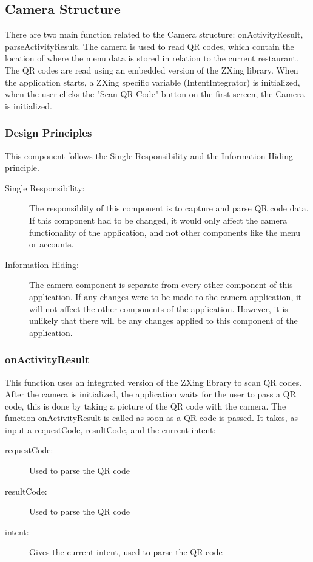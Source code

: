 \documentclass[12pt, titlepage]{article}
\begin{document}
\subsection{Camera Structure}
There are two main function related to the Camera structure: onActivityResult, parseActivityResult. The camera is used to read QR codes, which contain the location of where the menu data is stored in relation to the current restaurant. The QR codes are read using an embedded version of the ZXing library. When the application starts, a ZXing specific variable (IntentIntegrator) is initialized, when the user clicks the "Scan QR Code" button on the first screen, the Camera is initialized. 

\subsubsection{Design Principles}
This component follows the Single Responsibility and the Information Hiding principle.  

\begin{description}
	\item[Single Responsibility:] The responsiblity of this component is to capture and parse QR code data. If this component had to be changed, it would only affect the camera functionality of the application, and not other components like the menu or accounts.
	\item[Information Hiding:] The camera component is separate from every other component of this application. If any changes were to be made to the camera application, it will not affect the other components of the application. However, it is unlikely that there will be any changes applied to this component of the application.
\end{description}

\subsubsection{onActivityResult}
This function uses an integrated version of the ZXing library to scan QR codes. After the camera is initialized, the application waits for the user to pass a QR code, this is done by taking a picture of the QR code with the camera. The function onActivityResult is called as soon as a QR code is passed. It takes, as input a requestCode, resultCode, and the current intent: 

\begin{description}
  \item[requestCode:] Used to parse the QR code 
  \item[resultCode:] Used to parse the QR code 
  \item[intent:] Gives the current intent, used to parse the QR code
\end{description}
\end{document}
